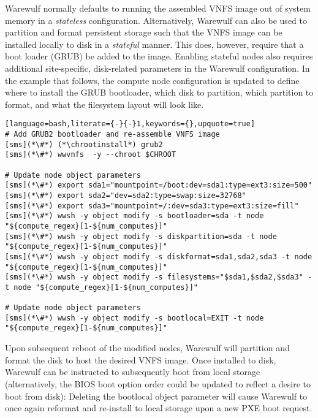 Warewulf normally defaults to running the assembled VNFS image out of system
memory in a {\em stateless} configuration. Alternatively, Warewulf can also be
used to partition and format persistent storage such that the VNFS image can be
installed locally to disk in a {\em stateful} manner.  This does, however,
require that a boot loader (GRUB) be added to the image. Enabling stateful nodes
also requires additional site-specific, disk-related parameters in the Warewulf
configuration. In the example that follows, the compute node configuration is
updated to define where to install the GRUB bootloader, which disk to partition,
which partition to format, and what the filesystem layout will look like.

\begin{lstlisting}[language=bash,literate={-}{-}1,keywords={},upquote=true]
# Add GRUB2 bootloader and re-assemble VNFS image
[sms](*\#*) (*\chrootinstall*) grub2
[sms](*\#*) wwvnfs  -y --chroot $CHROOT

# Update node object parameters
[sms](*\#*) export sda1="mountpoint=/boot:dev=sda1:type=ext3:size=500"
[sms](*\#*) export sda2="dev=sda2:type=swap:size=32768"
[sms](*\#*) export sda3="mountpoint=/:dev=sda3:type=ext3:size=fill"
[sms](*\#*) wwsh -y object modify -s bootloader=sda -t node "${compute_regex}[1-${num_computes}]" 
[sms](*\#*) wwsh -y object modify -s diskpartition=sda -t node "${compute_regex}[1-${num_computes}]" 
[sms](*\#*) wwsh -y object modify -s diskformat=sda1,sda2,sda3 -t node "${compute_regex}[1-${num_computes}]" 
[sms](*\#*) wwsh -y object modify -s filesystems="$sda1,$sda2,$sda3" -t node "${compute_regex}[1-${num_computes}]" 

# Update node object parameters
[sms](*\#*) wwsh -y object modify -s bootlocal=EXIT -t node "${compute_regex}[1-${num_computes}]"
\end{lstlisting}

\noindent Upon subsequent reboot of the modified nodes, Warewulf will partition
and format the disk to host the desired VNFS image.  Once installed to disk,
Warewulf can be instructed to subsequently boot from local storage
(alternatively, the BIOS boot option order could be updated to reflect a desire
to boot from disk): Deleting the bootlocal object parameter will cause Warewulf to once
again reformat and re-install to local storage upon a new PXE boot request.
